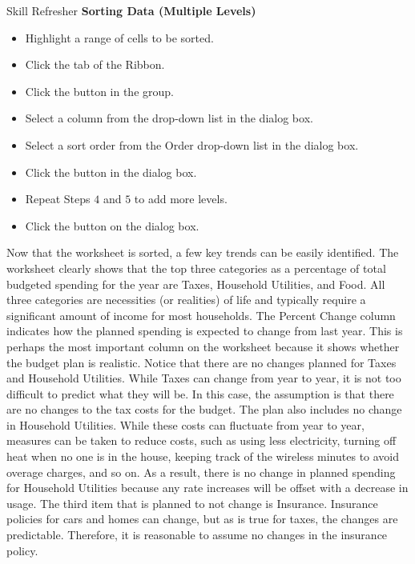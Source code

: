 \begin{center}
	\begin{sklbox}{Skill Refresher}
		\textbf{Sorting Data (Multiple Levels)}
		\\
		\begin{itemize}
			\setlength{\itemsep}{0pt}
			\setlength{\parskip}{0pt}
			\setlength{\parsep}{0pt}
			
			\item Highlight a range of cells to be sorted.
			\item Click the  tab of the Ribbon.
			\item Click the  button in the  group.
			\item Select a column from the  drop-down list in the  dialog box.
			\item Select a sort order from the Order drop-down list in the  dialog box.
			\item Click the  button in the  dialog box.
			\item Repeat Steps $ 4 $ and $ 5 $ to add more levels.
			\item Click the  button on the  dialog box.
			
		\end{itemize}
	\end{sklbox}
\end{center}

Now that the  worksheet is sorted, a few key trends can be easily identified. The worksheet clearly shows that the top three categories as a percentage of total budgeted spending for the year are Taxes, Household Utilities, and Food. All three categories are necessities (or realities) of life and typically require a significant amount of income for most households. The Percent Change column indicates how the planned spending is expected to change from last year. This is perhaps the most important column on the worksheet because it shows whether the budget plan is realistic. Notice that there are no changes planned for Taxes and Household Utilities. While Taxes can change from year to year, it is not too difficult to predict what they will be. In this case, the assumption is that there are no changes to the tax costs for the budget. The plan also includes no change in Household Utilities. While these costs can fluctuate from year to year, measures can be taken to reduce costs, such as using less electricity, turning off heat when no one is in the house, keeping track of the wireless minutes to avoid overage charges, and so on. As a result, there is no change in planned spending for Household Utilities because any rate increases will be offset with a decrease in usage. The third item that is planned to not change is Insurance. Insurance policies for cars and homes can change, but as is true for taxes, the changes are predictable. Therefore, it is reasonable to assume no changes in the insurance policy.

